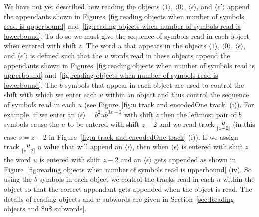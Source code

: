 \documentclass[11pt]{article} \usepackage{amsfonts,amsmath,amssymb,amsthm}
\newcommand{\tne}[1]{\ensuremath{\langle #1\rangle}}
\newcommand{\encodeOne}{\tne{1}}
\newcommand{\encodeZero}{\tne{0}}
\newcommand{\encodeDeletion}{\tne{\epsilon}}
\newcommand{\encodeDeletionSequence}{\ensuremath{b^2ub^{3x-2}}}
\newcommand{\encodeDeletionPrime}{\tne{\epsilon'}}
\newcommand{\track}[2]{\raisebox{2.5pt}{\ensuremath{\underset{[#1]}#2}}}
\begin{document}
We have not yet described how reading the objects $\encodeOne$, $\encodeZero$, $\encodeDeletion$, and $\encodeDeletionPrime$ append the appendants shown in Figures~\ref{fig:reading objects when number of symbols read is upperbound} and~\ref{fig:reading objects when number of symbols read is lowerbound}. To do so we must give the sequence of symbols read in each object when entered with shift $z$. 
The word $u$ that appears in the objects $\encodeOne$, $\encodeZero$, $\encodeDeletion$, and $\encodeDeletionPrime$ is defined such that the $u$ words read in these objects append the appendants shown in Figures~\ref{fig:reading objects when number of symbols read is upperbound} and~\ref{fig:reading objects when number of symbols read is lowerbound}. 
The $b$ symbols that appear in each object are used to control the shift with which we enter each $u$ within an object and thus control the sequence of symbols read in each $u$ (see Figure~\ref{fig:u track and encodedOne track} (i)). 
For example, if we enter an $\encodeDeletion=\encodeDeletionSequence$ with shift $z$ then the leftmost pair of $b$ symbols cause the $u$ to be entered with shift $z-2$ and we read track $\track{z-2}{u}$ (in this case $s=z-2$ in Figure~\ref{fig:u track and encodedOne track} (i)). 
If we assign track $\track{z-2}{u}$ a value that will append an $\encodeDeletion$, then when $\encodeDeletion$ is entered with shift $z$ the word $u$ is entered with shift $z-2$ and an $\encodeDeletion$ gets appended as shown in Figure~\ref{fig:reading objects when number of symbols read is upperbound} (iv).
So using the $b$ symbols in each object we control the tracks read in each $u$ within the object so that the correct appendant gets appended when the object is read. The details of reading objects and $u$ subwords are given in Section~\ref{sec:Reading objects and $u$ subwords}.
\end{document}
